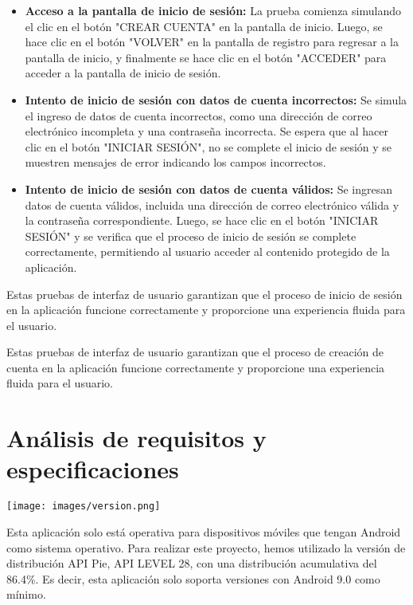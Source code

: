 \documentclass{article}
\begin{document}
\begin{itemize}
    \item \textbf{Acceso a la pantalla de inicio de sesión:} La prueba comienza simulando el clic en el botón "CREAR CUENTA" en la pantalla de inicio. Luego, se hace clic en el botón "VOLVER" en la pantalla de registro para regresar a la pantalla de inicio, y finalmente se hace clic en el botón "ACCEDER" para acceder a la pantalla de inicio de sesión.
    
    \item \textbf{Intento de inicio de sesión con datos de cuenta incorrectos:} Se simula el ingreso de datos de cuenta incorrectos, como una dirección de correo electrónico incompleta y una contraseña incorrecta. Se espera que al hacer clic en el botón "INICIAR SESIÓN", no se complete el inicio de sesión y se muestren mensajes de error indicando los campos incorrectos.
    
    \item \textbf{Intento de inicio de sesión con datos de cuenta válidos:} Se ingresan datos de cuenta válidos, incluida una dirección de correo electrónico válida y la contraseña correspondiente. Luego, se hace clic en el botón "INICIAR SESIÓN" y se verifica que el proceso de inicio de sesión se complete correctamente, permitiendo al usuario acceder al contenido protegido de la aplicación.
\end{itemize}

Estas pruebas de interfaz de usuario garantizan que el proceso de inicio de sesión en la aplicación funcione correctamente y proporcione una experiencia fluida para el usuario.



Estas pruebas de interfaz de usuario garantizan que el proceso de creación de cuenta en la aplicación funcione correctamente y proporcione una experiencia fluida para el usuario.








\section{Análisis de requisitos y especificaciones}

    \begin{minipage}{0.4\textwidth}
        \texttt{[image: images/version.png]}
    \end{minipage}
    \hfill
    \begin{minipage}{0.55\textwidth}
    Esta aplicación solo está operativa para dispositivos móviles que tengan Android como sistema operativo. Para realizar este proyecto, hemos utilizado la versión de distribución API Pie, API LEVEL 28, con una distribución acumulativa del 86.4\%. Es decir, esta aplicación solo soporta versiones con Android 9.0 como mínimo.
    \end{minipage}
\end{document}
